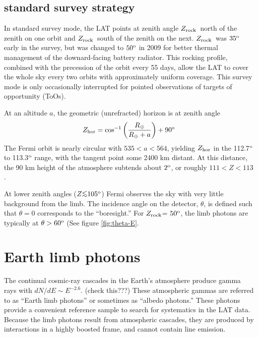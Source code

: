 \documentclass[aps,twocolumn,prd,superscriptaddress,showpacs,nofootinbib,fixfloat]{revtex4}
\newcommand{\be}{\begin{equation}}
\newcommand{\ee}{\end{equation}}
\newcommand{\degree}{^{\rm o}}
\newcommand{\zrock}{$Z_{\rm rock}$}
\def\la{\vcenter{\hbox{$<$}\offinterlineskip\hbox{$\sim$}}}
\begin{document}
\subsection{standard survey strategy}

In standard survey mode, the LAT points at zenith angle \zrock\ north of the
zenith on one orbit and \zrock\ south of the zenith on the next.  \zrock\ was
$35\degree$ early in the survey, but was changed to $50\degree$ in 2009 for
better thermal management of the downard-facing battery radiator.  This
rocking profile, combined with the precession of the orbit every 55 days,
allow the LAT to cover the whole sky every two orbits with approximately
uniform coverage.  This survey mode is only occasionally interrupted for
pointed observations of targets of opportunity (ToOs). 

At an altitude $a$, the geometric (unrefracted) horizon is at zenith angle
\be
Z_{\rm hor} = \cos^{-1}\left(\frac{R_\oplus}{R_\oplus+a}\right)+90\degree
\ee
The Fermi orbit is nearly circular with $535 < a < 564$, yielding $Z_{\rm
  hor}$ in the 112.7$\degree$ to 113.3$\degree$ range, with the tangent point
some 2400 km distant.  At this distance, the 90 km height of the atmosphere
subtends about $2\degree$, or roughly $111 < Z < 113$.  

At lower zenith angles ($Z \la 105\degree$) Fermi observes the sky with very
little background from the limb.  The incidence angle on the detector,
$\theta$, is defined such that $\theta=0$ corresponds to the ``boresight.''
For \zrock = $50\degree$, the limb photons are typically at $\theta >
60\degree$ (See figure \ref{fig:theta-E}.

\section{Earth limb photons}
The continual cosmic-ray cascades in the Earth's atmosphere produce gamma rays
with $dN/dE \sim E^{-2.6}$.  (check this???)  These atmospheric gammas are
referred to as ``Earth limb photons'' or sometimes as ``albedo photons.''
These photons provide a convenient reference sample to search for systematics
in the LAT data.  Because the limb photons result from atmospheric cascades,
they are produced by interactions in a highly boosted frame, and cannot
contain line emission. 
\end{document}
